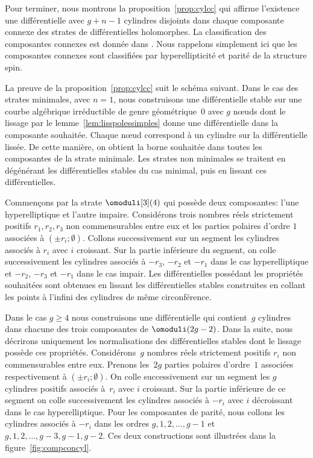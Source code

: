 Pour terminer, nous montrons la proposition~\ref{prop:cylcc} qui affirme l'existence une différentielle avec $g+n-1$ cylindres disjoints dans chaque composante connexe des strates de différentielles holomorphes. La classification des composantes connexes est donnée dans \cite[Th.\,1\,\&\,2]{kozo}. Nous rappelons simplement ici que les composantes connexes sont classifiées par hyperellipticité et parité de la structure spin.

La preuve de la proposition~\ref{prop:cylcc} suit le schéma suivant. Dans le cas des strates minimales, \ie avec $n=1$, nous construisons une différentielle stable sur une courbe algébrique irréductible de genre géométrique~$0$ avec $g$ nœuds dont le lissage par le lemme~\ref{lem:lisspolessimples} donne une différentielle dans la composante souhaitée. Chaque nœud correspond à un cylindre sur la différentielle lissée. De cette manière, on obtient la borne souhaitée dans toutes les composantes de la strate minimale. Les strates non minimales se traitent en dégénérant les différentielles stables du cas minimal, puis en lissant ces différentielles.

Commençons par la strate $\omoduli[3](4)$ qui possède deux composantes: l'une hyper\-elliptique et l'autre impaire. Considérons trois nombres réels strictement positifs $r_{1},r_{2},r_{3}$ non commensurables entre eux et les parties polaires d'ordre $1$ associées à $(\pm r_{i};\emptyset)$. Collons successivement sur un segment les cylindres associés à $r_{i}$ avec $i$ croissant. Sur la partie inférieure du segment, on colle successivement les cylindres associés à $-r_{3}$, $-r _{2}$ et $-r_{1}$ dans le cas hyperelliptique et $-r_{2}$, $-r_{3}$ et $-r_{1}$ dans le cas impair. Les différentielles possédant les propriétés souhaitées sont obtenues en lissant les différentielles stables construites en collant les points à l'infini des cylindres de même circonférence.

Dans le cas $g\geq4$ nous construisons une différentielle qui contient~$g$ cylindres dans chacune des trois composantes de $\omoduli(2g-2)$. Dans la suite, nous décrirons uniquement les normalisations des différentielles stables dont le lissage possède ces propriétés. Considérons~$g$ nombres réels strictement positifs $r_{i}$ non commensurables entre eux. Prenons les~$2g$ parties polaires d'ordre~$1$ associées respectivement à $(\pm r_{i};\emptyset)$. On colle successivement sur un segment les $g$ cylindres positifs associés à~$r_{i}$ avec $i$ croissant. Sur la partie inférieure de ce segment on colle successivement les cylindres associés à $-r_{i}$ avec $i$ décroissant dans le cas hyperelliptique. Pour les composantes de parité, nous collons les cylindres associés à $-r_{i}$ dans les ordres $g,1,2,\dots,g-1$ et $g,1,2,\dots,g-3,g-1,g-2$. Ces deux constructions sont illustrées dans la figure~\ref{fig:compconcyl}.


